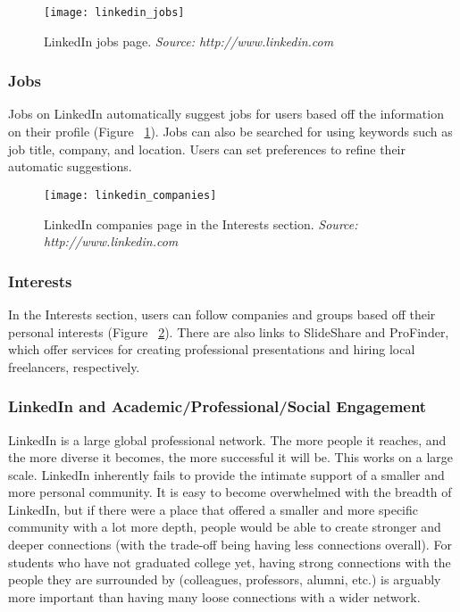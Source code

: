 \begin{figure}[h]
\centering
\texttt{[image: linkedin\_jobs]}
\caption{LinkedIn jobs page. \textit{Source: http://www.linkedin.com}}
\label{linkedin-jobs}
\end{figure}

\subsubsection{Jobs}

Jobs on LinkedIn automatically suggest jobs for users based off the information on their profile (Figure ~\ref{linkedin-jobs}). Jobs can also be searched for using keywords such as job title, company, and location. Users can set preferences to refine their automatic suggestions.

\begin{figure}[h]
\centering
\texttt{[image: linkedin\_companies]}
\caption{LinkedIn companies page in the Interests section. \textit{Source: http://www.linkedin.com}}
\label{linkedin-companies}
\end{figure}
\subsubsection{Interests}
In the Interests section, users can follow companies and groups based off their personal interests (Figure ~\ref{linkedin-companies}). There are also links to SlideShare and ProFinder, which offer services for creating professional presentations and hiring local freelancers, respectively.

\subsubsection{LinkedIn and Academic/Professional/Social Engagement}

LinkedIn is a large global professional network. The more people it reaches, and the more diverse it becomes, the more successful it will be. This works on a large scale.  LinkedIn inherently fails to provide the intimate support of a smaller and more personal community. It is easy to become overwhelmed with the breadth of LinkedIn, but if there were a place that offered a smaller and more specific community with a lot more depth, people would be able to create stronger and deeper connections (with the trade-off being having less connections overall). For students who have not graduated college yet, having strong connections with the people they are surrounded by (colleagues, professors, alumni, etc.) is arguably more important than having many loose connections with a wider network. 


